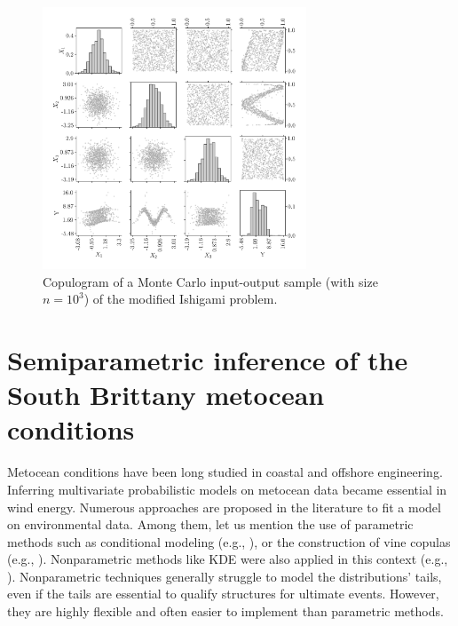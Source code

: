 \begin{figure}
    \centering
    \includegraphics[width=0.7\textwidth]{../numerical_experiments/chapter3/figures/ishigami_copluogram.png}
    \caption{Copulogram of a Monte Carlo input-output sample (with size $n=10^3$) of the modified Ishigami problem.}
    \label{fig:ishigami_copulogram}
\end{figure}



\section{Semiparametric inference of the South Brittany metocean conditions} \label{sec:32_inference}
Metocean conditions have been long studied in coastal and offshore engineering. 
Inferring multivariate probabilistic models on metocean data became essential in wind energy. 
Numerous approaches are proposed in the literature to fit a model on environmental data. 
Among them, let us mention the use of parametric methods such as conditional modeling (e.g., \citealp{bitner_2015_joint,vanem_fekhari_2023}), or the construction of vine copulas (e.g., \citealp{vanem_2016,montes_2016_cvines_metocean,lin_2019_cvines_waves}). 
Nonparametric methods like KDE were also applied in this context (e.g., \citealp{han_2018_kde_metocean}). 
Nonparametric techniques generally struggle to model the distributions' tails, even if the tails are essential to qualify structures for ultimate events. 
However, they are highly flexible and often easier to implement than parametric methods.

